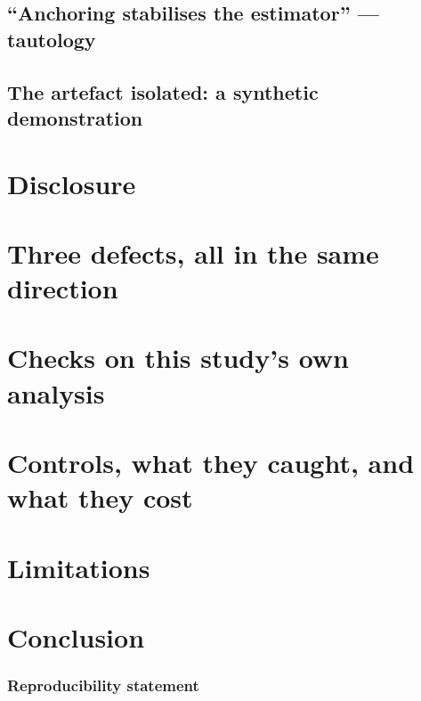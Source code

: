 \documentclass[11pt]{article}
\begin{document}
\subsection{``Anchoring stabilises the estimator'' --- tautology}\label{sec:tautology}


\subsection{The artefact isolated: a synthetic demonstration}\label{sec:synthetic}


\section{Disclosure}\label{sec:disclosure}


\section{Three defects, all in the same direction}\label{sec:defects}


\section{Checks on this study's own analysis}\label{sec:checks}


\section{Controls, what they caught, and what they cost}\label{sec:taxonomy}


\section{Limitations}\label{sec:limitations}


\section{Conclusion}\label{sec:conclusion}


\subsubsection*{Reproducibility statement}

\end{document}
